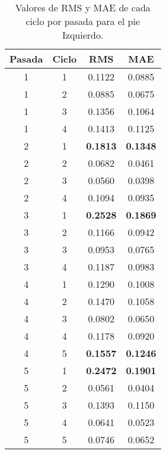 \begin{table}[H]
\centering
\renewcommand{\arraystretch}{1.2}
\begin{tabular}{|c|c|c|c|}
\hline
\textbf{Pasada} & \textbf{Ciclo} & \textbf{RMS} & \textbf{MAE} \\
\hline
1 & 1 & 0.1122 & 0.0885 \\
\hline
1 & 2 & 0.0885 & 0.0675 \\
\hline
1 & 3 & 0.1356 & 0.1064 \\
\hline
1 & 4 & 0.1413 & 0.1125 \\
\hline
2 & 1 & \textbf{0.1813} & \textbf{0.1348} \\
\hline
2 & 2 & 0.0682 & 0.0461 \\
\hline
2 & 3 & 0.0560 & 0.0398 \\
\hline
2 & 4 & 0.1094 & 0.0935 \\
\hline
3 & 1 & \textbf{0.2528} & \textbf{0.1869} \\
\hline
3 & 2 & 0.1166 & 0.0942 \\
\hline
3 & 3 & 0.0953 & 0.0765 \\
\hline
3 & 4 & 0.1187 & 0.0983 \\
\hline
4 & 1 & 0.1290 & 0.1008 \\
\hline
4 & 2 & 0.1470 & 0.1058 \\
\hline
4 & 3 & 0.0802 & 0.0650 \\
\hline
4 & 4 & 0.1178 & 0.0920 \\
\hline
4 & 5 & \textbf{0.1557} & \textbf{0.1246} \\
\hline
5 & 1 & \textbf{0.2472} & \textbf{0.1901} \\
\hline
5 & 2 & 0.0561 & 0.0404 \\
\hline
5 & 3 & 0.1393 & 0.1150 \\
\hline
5 & 4 & 0.0641 & 0.0523 \\
\hline
5 & 5 & 0.0746 & 0.0652 \\
\hline
\end{tabular}
\caption{Valores de RMS y MAE de cada ciclo por pasada para el pie Izquierdo.}
\label{tab:rms_mae_pie_izquierdo}
\end{table}
